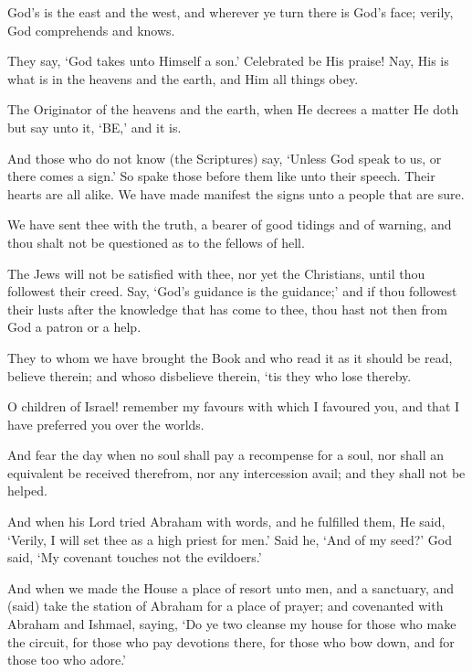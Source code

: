 \documentclass[fontsize=14pt, letterpaper, notitlepage, openany, DIV=12]{scrbook} %
\begin{document}
\noindent[2:115]
God's is the east and the west, and wherever ye turn there is God's face; verily, God
comprehends and knows.

\noindent[2:116]
They say, `God takes unto Himself a son.' Celebrated be His praise! Nay, His is what is
in the heavens and the earth, and Him all things obey.

\noindent[2:117]
The Originator of the heavens and the earth, when He decrees a matter He doth but say
unto it, `BE,' and it is.

\noindent[2:118]
And those who do not know (the Scriptures) say, `Unless God speak to us, or there comes
a sign.' So spake those before them like unto their speech. Their hearts are all alike. We have
made manifest the signs unto a people that are sure.

\noindent[2:119]
We have sent thee with the truth, a bearer of good tidings and of warning, and thou shalt
not be questioned as to the fellows of hell.

\noindent[2:120]
The Jews will not be satisfied with thee, nor yet the Christians, until thou followest their
creed. Say, `God's guidance is the guidance;' and if thou followest their lusts after the
knowledge that has come to thee, thou hast not then from God a patron or a help.

\noindent[2:121]
They to whom we have brought the Book and who read it as it should be read, believe
therein; and whoso disbelieve therein, `tis they who lose thereby.

\noindent[2:122]
O children of Israel! remember my favours with which I favoured you, and that I have
preferred you over the worlds.

\noindent[2:123]
And fear the day when no soul shall pay a recompense for a soul, nor shall an equivalent
be received therefrom, nor any intercession avail; and they shall not be helped.

\noindent[2:124]
And when his Lord tried Abraham with words, and he fulfilled them, He said, `Verily, I
will set thee as a high priest for men.' Said he, `And of my seed?' God said, `My covenant
touches not the evildoers.'

\noindent[2:125]
And when we made the House a place of resort unto men, and a sanctuary, and (said)
take the station of Abraham for a place of prayer; and covenanted with Abraham and Ishmael,
saying, `Do ye two cleanse my house for those who make the circuit, for those who pay
devotions there, for those who bow down, and for those too who adore.'
\end{document}
